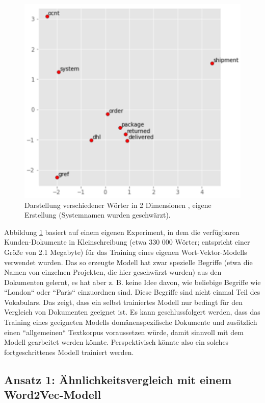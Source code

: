 \begin{figure}[]
\centering
\includegraphics[scale=0.9]{content/pics/Picture_11.png}
\caption{Darstellung verschiedener Wörter in 2 Dimensionen , eigene Erstellung (Systemnamen wurden geschwärzt).}
\label{Abbildung:wordvecintuition}
\end{figure}

Abbildung \ref{Abbildung:wordvecintuition} basiert auf einem eigenen Experiment, in dem die verfügbaren Kunden-Dokumente in Kleinschreibung (etwa 330 000 Wörter; entspricht einer Größe von 2.1 Megabyte) für das Training eines eigenen Wort-Vektor-Modells verwendet wurden. Das so erzeugte Modell hat zwar spezielle Begriffe (etwa die Namen von einzelnen Projekten, die hier geschwärzt wurden) aus den Dokumenten gelernt, es hat aber z. B. keine Idee davon, wie beliebige Begriffe wie ``London`` oder ``Paris`` einzuordnen sind. Diese Begriffe sind nicht einmal Teil des Vokabulars. Das zeigt, dass ein selbst trainiertes Modell nur bedingt für den Vergleich von Dokumenten geeignet ist. Es kann geschlussfolgert werden, dass das Training eines geeigneten Modells domänenspezifische Dokumente und zusätzlich einen ``allgemeinen`` Textkorpus voraussetzen würde, damit sinnvoll mit dem Modell gearbeitet werden könnte. Perspektivisch könnte also ein solches fortgeschrittenes Modell trainiert werden. 

\subsection{Ansatz 1: Ähnlichkeitsvergleich mit einem Word2Vec-Modell}

